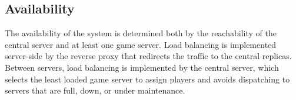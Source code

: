 \documentclass{scrartcl}
\begin{document}

\subsection{Availability}\label{availability}

The availability of the system is determined both by the reachability of the central server and at least one game server.
Load balancing is implemented server-side by the reverse proxy that redirects the traffic to the central replicas.
Between servers, load balancing is implemented by the central server, which selects the least loaded game server to assign players and avoids dispatching to servers that are full, down, or under maintenance.
\end{document}
